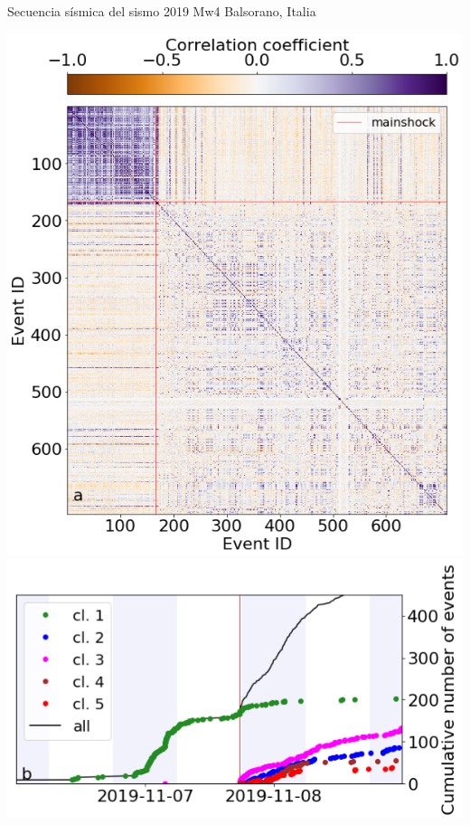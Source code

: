 \documentclass{beamer}
\begin{document}
\begin{frame}
 {Secuencia s\'ismica del sismo 2019 Mw4 Balsorano, Italia}

\vskip -0.2cm \begin{minipage}{0.48\linewidth}
   \includegraphics[width=0.95\linewidth]{images/matrix.png}
   \includegraphics[width=0.95\linewidth]{images/cummulative.png}
 \end{minipage} 
 \begin{minipage}{0.5\linewidth}

\end{minipage}
\end{frame}
\end{document}
